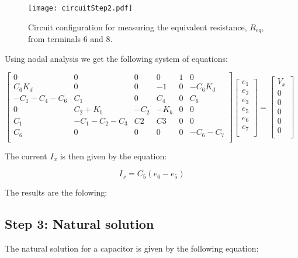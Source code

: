 \begin{figure}[H] \centering
  \texttt{[image: circuitStep2.pdf]}
  \caption{Circuit configuration for measuring the equivalent resistance, $R_{eq}$, from terminals $6$ and $8$.}
  \label{fig: step 2}
\end{figure}

Using nodal analysis we get the following system of equations:
    	
$\begin{bmatrix}
0  &  0 &  0 &  0 & 1 & 0\\
C_6 K_d & 0 & 0 & -1 & 0 & -C_6 K_d\\
-C_1-C_4-C_6 & C_1 & 0 & C_4 & 0 & C_6\\
0 & C_2+ K_b & -C_2 & -K_b & 0 & 0\\
C_1 & -C_1-C_2-C_3 & C2 & C3 & 0 & 0\\
C_6 & 0 & 0 & 0 & 0 & -C_6-C_7\\
\end{bmatrix}
\begin{bmatrix}
e_1\\
e_2\\
e_3\\
e_5\\
e_6\\
e_7\\
\end{bmatrix}
=
\begin{bmatrix}
V_x\\
0\\
0\\
0\\
0\\
0\\
\end{bmatrix}$

The current $I_x$ is then given by the equation:

\begin{equation}
    I_x = C_5(e_6-e_5) 
\end{equation}

The results are the folowing:


 



 \subsection{Step 3: Natural solution}
The natural solution for a capacitor is given by the following equation:

